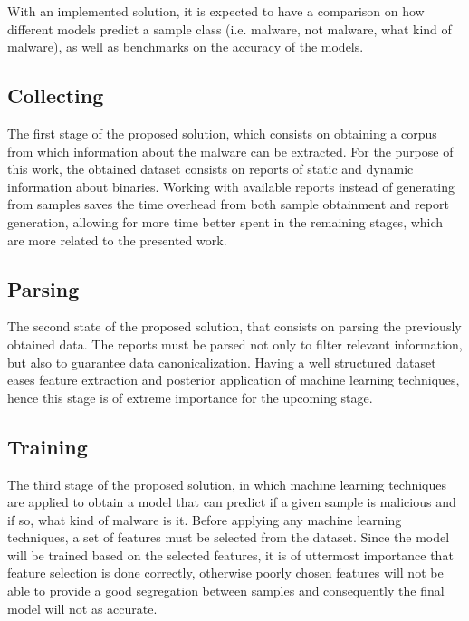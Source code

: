 \documentclass{llncs}
\begin{document}
With an implemented solution, it is expected to have a comparison on how different models predict a sample class (i.e. malware, not malware, what kind of malware), as well as benchmarks on the accuracy of the models.

\subsection{Collecting}
The first stage of the proposed solution, which consists on obtaining a corpus from which information about the malware can be extracted. For the purpose of this work, the obtained dataset consists on reports of static and dynamic information about binaries. Working with available reports instead of generating from samples saves the time overhead from both sample obtainment and report generation, allowing for more time better spent in the remaining stages, which are more related to the presented work.

\subsection{Parsing}
The second state of the proposed solution, that consists on parsing the previously obtained data. The reports must be parsed not only to filter relevant information, but also to guarantee data canonicalization. Having a well structured dataset eases feature extraction and posterior application of machine learning techniques, hence this stage is of extreme importance for the upcoming stage.

\subsection{Training}
The third stage of the proposed solution, in which machine learning techniques are applied to obtain a model that can predict if a given sample is malicious and if so, what kind of malware is it. Before applying any machine learning techniques, a set of features must be selected from the dataset. Since the model will be trained based on the selected features, it is of uttermost importance that feature selection is done correctly, otherwise poorly chosen features will not be able to provide a good segregation between samples and consequently the final model will not as accurate.

\end{document}
